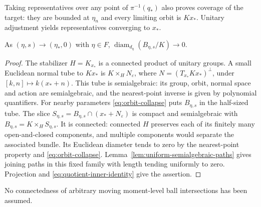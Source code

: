 Taking representatives over any point of $\pi^{-1}(q_*)$ also
proves coverage of the target: they are bounded at $\eta_n$ and
every limiting orbit is $Kx_*$. Unitary adjustment yields
representatives converging to $x_*$.

\begin{lemma}\label{lem:shrinking-diameter}
As $(\eta,s)\to(\eta_*,0)$ with $\eta\in F$,
$\operatorname{diam}_{d_\eta}(B_{\eta,s}/K)\to0$.
\end{lemma}
\begin{proof}
The stabilizer $H=K_{x_*}$ is a connected product of unitary groups.
A small Euclidean normal tube to $Kx_*$ is
$K\times_HN_\varepsilon$, where $N=(T_{x_*}Kx_*)^\perp$,
under $[k,n]\mapsto k(x_*+n)$.
This tube is semialgebraic: its group, orbit, normal space and
action are semialgebraic, and the nearest-point inverse is given
by polynomial quantifiers.
For nearby parameters \eqref{eq:orbit-collapse} puts $B_{\eta,s}$
in the half-sized tube. The slice
$S_{\eta,s}=B_{\eta,s}\cap(x_*+N_\varepsilon)$ is compact and
semialgebraic with $B_{\eta,s}=K\times_HS_{\eta,s}$.
It is connected: connected $H$ preserves each of its finitely
many open-and-closed components, and multiple components would
separate the associated bundle.
Its Euclidean diameter tends to zero by the nearest-point property
and \eqref{eq:orbit-collapse}.
Lemma~\ref{lem:uniform-semialgebraic-paths} gives joining paths
in this fixed family with length tending uniformly to zero.
Projection and \eqref{eq:quotient-inner-identity} give the assertion.
\end{proof}
No connectedness of arbitrary moving moment-level ball intersections
has been assumed.

